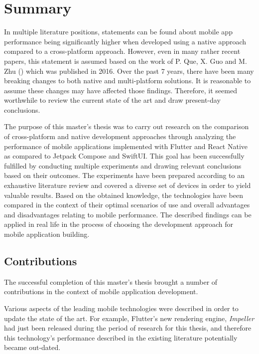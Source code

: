 
\chapter{Summary}

In multiple literature positions, statements can be found about mobile app performance being significantly higher when developed using a native approach compared to a cross-platform approach. However, even in many rather recent papers, this statement is assumed based on the work of P. Que, X. Guo and M. Zhu (\cite{que_comp_hybrid_native}) which was published in 2016. Over the past 7 years, there have been many breaking changes to both native and multi-platform solutions. It is reasonable to assume these changes may have affected those findings. Therefore, it seemed worthwhile to review the current state of the art and draw present-day conclusions.

The purpose of this master's thesis was to carry out research on the comparison of cross-platform and native development approaches through analyzing the performance of mobile applications implemented with Flutter and React Native as compared to Jetpack Compose and SwiftUI. This goal has been successfully fulfilled by conducting multiple experiments and drawing relevant conclusions based on their outcomes. The experiments have been prepared according to an exhaustive literature review and covered a diverse set of devices in order to yield valuable results. Based on the obtained knowledge, the technologies have been compared in the context of their optimal scenarios of use and overall advantages and disadvantages relating to mobile performance. The described findings can be applied in real life in the process of choosing the development approach for mobile application building.

\section{Contributions}

The successful completion of this master's thesis brought a number of contributions in the context of mobile application development.

Various aspects of the leading mobile technologies were described in order to update the state of the art. For example, Flutter's new rendering engine, \emph{Impeller} had just been released during the period of research for this thesis, and therefore this technology's performance described in the existing literature potentially became out-dated.

